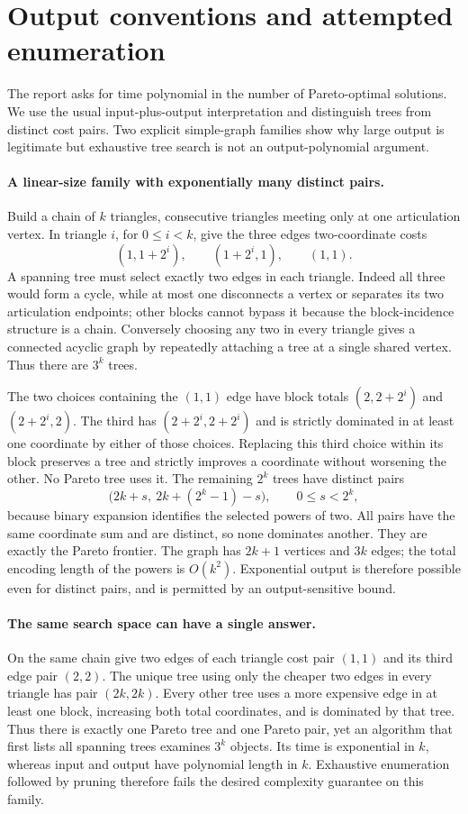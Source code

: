 \documentclass[11pt]{article}
\begin{document}
\section{Output conventions and attempted enumeration}
The report asks for time polynomial in the number of Pareto-optimal
solutions. We use the usual input-plus-output interpretation and
distinguish trees from distinct cost pairs. Two explicit simple-graph
families show why large output is legitimate but exhaustive tree
search is not an output-polynomial argument.

\paragraph{A linear-size family with exponentially many distinct pairs.}
Build a chain of $k$ triangles, consecutive triangles meeting only
at one articulation vertex. In triangle $i$, for $0\le i<k$,
give the three edges two-coordinate costs
\[
(1,1+2^i),\qquad(1+2^i,1),\qquad(1,1).
\]
A spanning tree must select exactly two edges in each triangle.
Indeed all three would form a cycle, while at most one disconnects
a vertex or separates its two articulation endpoints; other blocks
cannot bypass it because the block-incidence structure is a chain.
Conversely choosing any two in every triangle gives a connected
acyclic graph by repeatedly attaching a tree at a single shared
vertex. Thus there are $3^k$ trees.

The two choices containing the $(1,1)$ edge have block totals
$(2,2+2^i)$ and $(2+2^i,2)$. The third has
$(2+2^i,2+2^i)$ and is strictly dominated in at least one
coordinate by either of those choices. Replacing this third choice
within its block preserves a tree and strictly improves a coordinate
without worsening the other. No Pareto tree uses it. The remaining
$2^k$ trees have distinct pairs
\[
\bigl(2k+s,\ 2k+(2^k-1)-s\bigr),\qquad0\le s<2^k,
\]
because binary expansion identifies the selected powers of two.
All pairs have the same coordinate sum and are distinct, so none
dominates another. They are exactly the Pareto frontier. The graph
has $2k+1$ vertices and $3k$ edges; the total encoding length
of the powers is $O(k^2)$. Exponential output is therefore possible
even for distinct pairs, and is permitted by an output-sensitive bound.

\paragraph{The same search space can have a single answer.}
On the same chain give two edges of each triangle cost pair
$(1,1)$ and its third edge pair $(2,2)$. The unique tree using
only the cheaper two edges in every triangle has pair $(2k,2k)$.
Every other tree uses a more expensive edge in at least one block,
increasing both total coordinates, and is dominated by that tree.
Thus there is exactly one Pareto tree and one Pareto pair, yet an
algorithm that first lists all spanning trees examines $3^k$ objects.
Its time is exponential in $k$, whereas input and output have
polynomial length in $k$. Exhaustive enumeration followed by pruning
therefore fails the desired complexity guarantee on this family.
\end{document}

